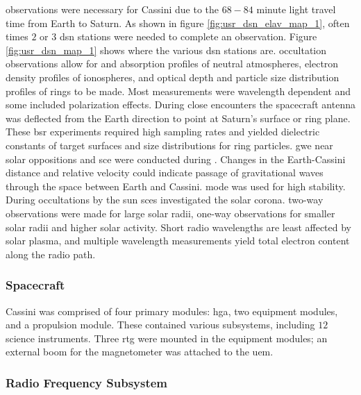\documentclass[oneside]{book}
\theoremstyle{mystyle}
\begin{document}
\noindent observations were necessary for Cassini due to the $68-84$ minute light travel time from Earth to Saturn. As shown in figure \ref{fig:usr_dsn_elav_map_1}, often times $2$ or $3$ \gls{dsn} stations were needed to complete an observation. Figure \ref{fig:usr_dsn_map_1} shows where the various \gls{dsn} stations are. \Gls{occultation} observations allow for  and \glspl{absorption profile} of \glspl{neutral atmosphere}, \glspl{electron density profile} of \glspl{ionosphere}, and \gls{optical depth} and \gls{particle size distribution} profiles of rings to be made. Most measurements were wavelength dependent and some included \gls{polarization} effects. During close encounters the spacecraft antenna was deflected from the Earth direction to point at Saturn's surface or ring plane. These  \gls{bsr} experiments required high \glspl{sampling rate} and yielded dielectric constants of target surfaces and size distributions for ring particles. \gls{gwe} near \glspl{solar opposition} and \gls{sce} were conducted during . Changes in the Earth-Cassini distance and \gls{relative velocity} could indicate passage of gravitational waves through the space between Earth and Cassini.  mode was used for high stability. During \glspl{occultation} by the sun \glspl{sce} investigated the \gls{solar corona}. \Glspl{two-way observation} were made for large solar radii, \glspl{one-way observation} for smaller solar radii and higher solar activity. Short radio \glspl{wavelength} are least affected by \gls{solar plasma}, and multiple \gls{wavelength} measurements yield total \gls{electron} content along the \gls{radio path}. 



\subsubsection{Spacecraft \label{subsubsec:usr_spacecraft}}

Cassini was comprised of four primary modules: \gls{hga}, two equipment modules, and a propulsion module. These contained various subsystems, including $12$ science instruments. Three \gls{rtg} were mounted in the equipment modules; an external boom for the magnetometer was attached to the \gls{uem}. \hspace*{\fill}

\subsubsection{\footnotesize Radio Frequency Subsystem \label{subsubsec:usr_rad_freq_subsys}}
\end{document}
